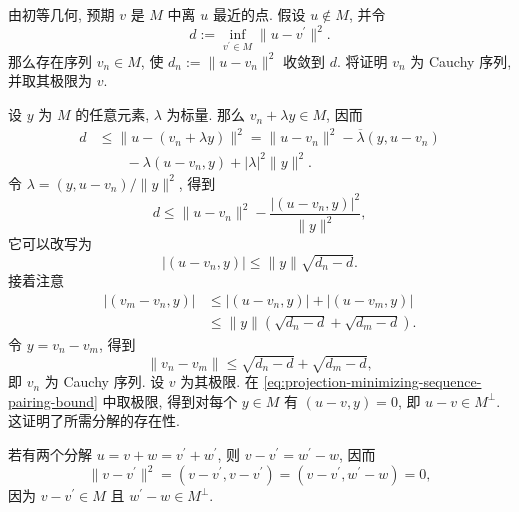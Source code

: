 \begin{Proof}
由初等几何, 预期 $v$ 是 $M$ 中离 $u$ 最近的点. 假设 $u\notin M$, 并令
\begin{equation}\label{eq:hilbert-projection-infimum-distance}
d:=\inf_{v^{\prime}\in M}\|u-v^{\prime}\|^2.
\end{equation}
那么存在序列 $v_n\in M$, 使 $d_n:=\|u-v_n\|^2$ 收敛到 $d$. 将证明 $v_n$ 为 Cauchy 序列, 并取其极限为 $v$.

设 $y$ 为 $M$ 的任意元素, $\lambda$ 为标量. 那么 $v_n+\lambda y\in M$, 因而
\begin{equation}\label{eq:projection-minimizing-sequence-perturbation}
\begin{aligned}
d&\leq\|u-(v_n+\lambda y)\|^2=\|u-v_n\|^2-\overline\lambda(y,u-v_n)\\
&\qquad-\lambda(u-v_n,y)+|\lambda|^2\|y\|^2.
\end{aligned}
\end{equation}
令 $\lambda=(y,u-v_n)/\|y\|^2$, 得到
\begin{equation}\label{eq:projection-minimizing-sequence-optimized-bound}
d\leq\|u-v_n\|^2-\dfrac{|(u-v_n,y)|^2}{\|y\|^2},
\end{equation}
它可以改写为
\begin{equation}\label{eq:projection-minimizing-sequence-pairing-bound}
|(u-v_n,y)|\leq\|y\|\sqrt{d_n-d}.
\end{equation}
接着注意
\begin{equation}\label{eq:projection-minimizing-sequence-difference-pairing}
\begin{aligned}
|(v_m-v_n,y)|&\leq|(u-v_n,y)|+|(u-v_m,y)|\\
&\leq\|y\|(\sqrt{d_n-d}+\sqrt{d_m-d}).
\end{aligned}
\end{equation}
令 $y=v_n-v_m$, 得到
\begin{equation}\label{eq:projection-minimizing-sequence-cauchy-bound}
\|v_n-v_m\|\leq\sqrt{d_n-d}+\sqrt{d_m-d},
\end{equation}
即 $v_n$ 为 Cauchy 序列. 设 $v$ 为其极限. 在 \eqref{eq:projection-minimizing-sequence-pairing-bound} 中取极限, 得到对每个 $y\in M$ 有 $(u-v,y)=0$, 即 $u-v\in M^\perp$. 这证明了所需分解的存在性.

若有两个分解 $u=v+w=v^{\prime}+w^{\prime}$, 则 $v-v^{\prime}=w^{\prime}-w$, 因而
\begin{equation}\label{eq:orthogonal-projection-decomposition-uniqueness}
\|v-v^{\prime}\|^2=(v-v^{\prime},v-v^{\prime})=(v-v^{\prime},w^{\prime}-w)=0,
\end{equation}
因为 $v-v^{\prime}\in M$ 且 $w^{\prime}-w\in M^\perp$.
\end{Proof}

